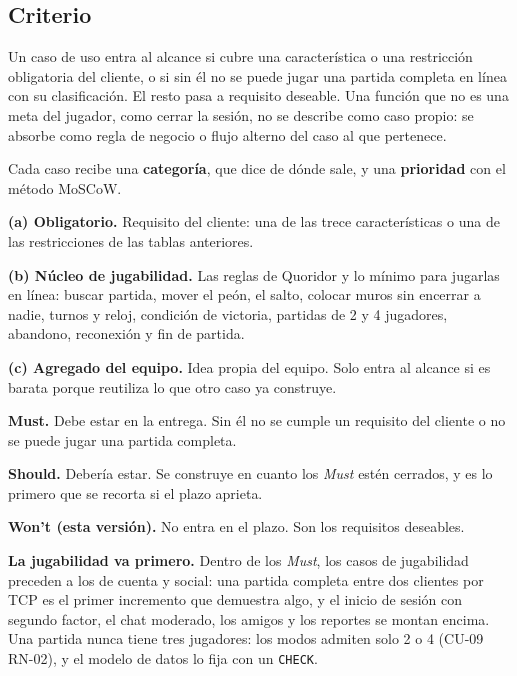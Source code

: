 \subsection*{Criterio}

Un caso de uso entra al alcance si cubre una característica o una restricción obligatoria del cliente, o si sin él no se puede jugar una partida completa en línea con su clasificación. El resto pasa a requisito deseable. Una función que no es una meta del jugador, como cerrar la sesión, no se describe como caso propio: se absorbe como regla de negocio o flujo alterno del caso al que pertenece.

Cada caso recibe una \textbf{categoría}, que dice de dónde sale, y una \textbf{prioridad} con el método MoSCoW.

\begin{reglas}
  \item \textbf{(a) Obligatorio.} Requisito del cliente: una de las trece características o una de las restricciones de las tablas anteriores.
  \item \textbf{(b) Núcleo de jugabilidad.} Las reglas de Quoridor y lo mínimo para jugarlas en línea: buscar partida, mover el peón, el salto, colocar muros sin encerrar a nadie, turnos y reloj, condición de victoria, partidas de 2 y 4 jugadores, abandono, reconexión y fin de partida.
  \item \textbf{(c) Agregado del equipo.} Idea propia del equipo. Solo entra al alcance si es barata porque reutiliza lo que otro caso ya construye.
\end{reglas}

\begin{reglas}
  \item \textbf{Must.} Debe estar en la entrega. Sin él no se cumple un requisito del cliente o no se puede jugar una partida completa.
  \item \textbf{Should.} Debería estar. Se construye en cuanto los \textit{Must} estén cerrados, y es lo primero que se recorta si el plazo aprieta.
  \item \textbf{Won't (esta versión).} No entra en el plazo. Son los requisitos deseables.
\end{reglas}

\textbf{La jugabilidad va primero.} Dentro de los \textit{Must}, los casos de jugabilidad preceden a los de cuenta y social: una partida completa entre dos clientes por TCP es el primer incremento que demuestra algo, y el inicio de sesión con segundo factor, el chat moderado, los amigos y los reportes se montan encima. Una partida nunca tiene tres jugadores: los modos admiten solo 2 o 4 (\mbox{CU-09} \mbox{RN-02}), y el modelo de datos lo fija con un \texttt{CHECK}.

